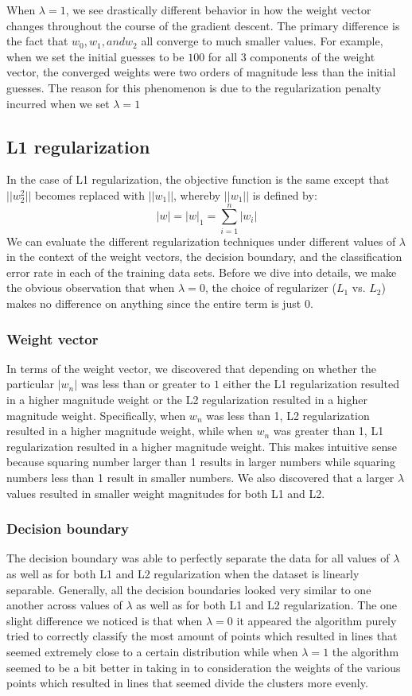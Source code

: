 \documentclass{article}
\begin{document}
When $\lambda = 1$, we see drastically different behavior in how the weight vector changes throughout the course of the gradient descent. The primary difference is the fact that $w_{0}, w_{1}, and w_{2}$ all converge to much smaller values. For example, when we set the initial guesses to be $100$ for all 3 components of the weight vector, the converged weights were two orders of magnitude less than the initial guesses. The reason for this phenomenon is due to the regularization penalty incurred when we set $\lambda = 1$

\subsection{L1 regularization}
In the case of L1 regularization, the objective function is the same except that $||w^2_2||$ becomes replaced with $||w_1||$, whereby $||w_1||$ is defined by:
$$|w| = |w|_1 = \sum_{i=1}^n |w_i|$$
We can evaluate the different regularization techniques under different values of $\lambda$ in the context of the weight vectors, the decision boundary, and the classification error rate in each of the training data sets. Before we dive into details, we make the obvious observation that when $\lambda = 0$, the choice of regularizer ($L_1$ vs. $L_2$) makes no difference on anything since the entire term is just $0$.

\subsubsection{Weight vector}
In terms of the weight vector, we discovered that depending on whether the particular $|w_n|$ was less than or greater to $1$ either the L1 regularization resulted in a higher magnitude weight or the L2 regularization resulted in a higher magnitude weight. Specifically, when $w_n$ was less than 1, L2 regularization resulted in a higher magnitude weight, while when $w_n$ was greater than 1, L1 regularization resulted in a higher magnitude weight.   This makes intuitive sense because squaring number larger than 1 results in larger numbers while squaring numbers less than 1 result in smaller numbers. We also discovered that a larger $\lambda$ values resulted in smaller weight magnitudes for both L1 and L2.

\subsubsection{Decision boundary}
The decision boundary was able to perfectly separate the data for all values of $\lambda$ as well as for both L1 and L2 regularization when the dataset is linearly separable. Generally, all the decision boundaries looked very similar to one another across values of $\lambda$ as well as for both L1 and L2 regularization. The one slight difference we noticed is that when $\lambda = 0$ it appeared the algorithm purely tried to correctly classify the most amount of points which resulted in lines that seemed extremely close to a certain distribution while when $\lambda =1$ the algorithm seemed to be a bit better in taking in to consideration the weights of the various points which resulted in lines that seemed divide the clusters more evenly.
\end{document}
